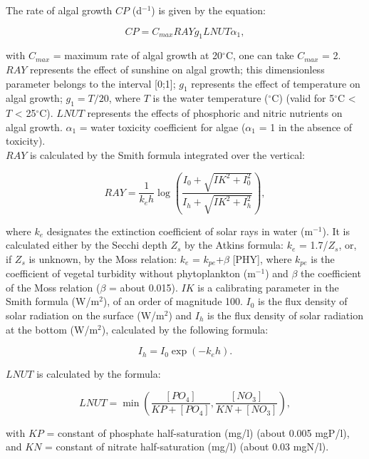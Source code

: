 The rate of algal growth $CP$ (d$^{-1}$) is given by the equation:

\begin{equation}
  CP = C_{max} RAY g_1 LNUT \alpha_1,
\end{equation}

with $C_{max}$ = maximum rate of algal growth at 20$^{\circ}$C, one can take $C_{max}$ = 2.
$RAY$ represents the effect of sunshine on algal growth;
this dimensionless parameter belongs to the interval [0;1];
$g_1$ represents the effect of temperature on algal growth;
$g_1 = T/20$, where $T$ is the water temperature ($^{\circ}$C) (valid for 5$^{\circ}$C < $T$ < 25$^{\circ}$C).
$LNUT$ represents the effects of phosphoric and nitric nutrients on algal growth.
$\alpha_1$ = water toxicity coefficient for algae ($\alpha_1$ = 1 in the absence of toxicity).\\
$RAY$ is calculated by the Smith formula integrated over the vertical:

\begin{equation}
  RAY = \frac{1}{k_e h} \log \left( \frac{I_0 + \sqrt{IK^2+I_0^2} }{ I_h + \sqrt{IK^2+I_h^2} }  \right),
\end{equation}

where $k_e$ designates the extinction coefficient of solar rays in water (m$^{-1}$).
It is calculated either by the Secchi depth $Z_s$ by the Atkins formula: $k_e$ = 1.7/$Z_s$, or,
if $Z_s$ is unknown, by the Moss relation: $k_e$ = $k_{pe}$+$ \beta $ [PHY],
where $k_{pe}$ is the coefficient of vegetal turbidity without phytoplankton (m$^{-1}$)
and $ \beta $  the coefficient of the Moss relation ($ \beta $  = about 0.015).
$IK$ is a calibrating parameter in the Smith formula (W/m$^2$), of an order of magnitude 100.
$I_0$ is the flux density of solar radiation on the surface (W/m$^2$)
and $I_h$ is the flux density of solar radiation at the bottom (W/m$^2$), calculated by the following formula:

\begin{equation}
  I_h = I_0 \exp (-k_e h).
\end{equation}

$LNUT$ is calculated by the formula:

\begin{equation}
  LNUT = \min \left( \frac{[PO_4]}{KP+[PO_4]}, \frac{[NO_3]}{KN+[NO_3]} \right),
\end{equation}

with $KP$ = constant of phosphate half-saturation (mg/l) (about 0.005 mgP/l),
and $KN$ = constant of nitrate half-saturation (mg/l) (about 0.03 mgN/l).\\

